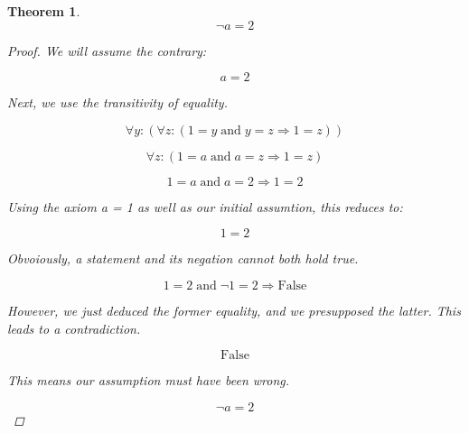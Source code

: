 \documentclass{article}
\newtheorem{theorem}{Theorem}
\begin{document}
\begin{theorem}
\begin{equation}
\neg {{a} = {2}}
\end{equation}

\begin{proof}
We will assume the contrary:

\begin{equation}
{a} = {2}
\end{equation}

Next, we use the transitivity of equality.

\begin{equation}
\forall {y} : {\left( \forall {z} : {\left( {{{1} = {y}} \; \mathrm{ and } \; {{y} = {z}}} \Longrightarrow {{1} = {z}}\right)}\right)}
\end{equation}

\begin{equation}
\forall {z} : {\left( {{{1} = {a}} \; \mathrm{ and } \; {{a} = {z}}} \Longrightarrow {{1} = {z}}\right)}
\end{equation}

\begin{equation}
{{{1} = {a}} \; \mathrm{ and } \; {{a} = {2}}} \Longrightarrow {{1} = {2}}
\end{equation}

Using the axiom  a = 1 as well as our initial assumtion, this reduces to:

\begin{equation}
{1} = {2}
\end{equation}

Obvoiously, a statement and its negation cannot both hold true.

\begin{equation}
{{{1} = {2}} \; \mathrm{ and } \; {\neg {{1} = {2}}}} \Longrightarrow {\mathrm{False}}
\end{equation}

However, we just deduced the former equality, and we presupposed the latter. This leads to a contradiction.

\begin{equation}
\mathrm{False}
\end{equation}

This means our assumption must have been wrong.

\begin{equation}
\neg {{a} = {2}}
\end{equation}

\end{proof}
\end{theorem}
\end{document}
